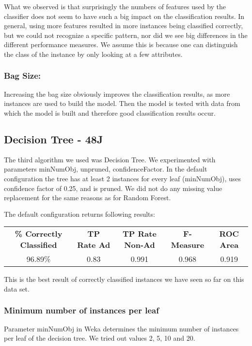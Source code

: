 \documentclass{article}
\begin{document}
What we observed is that surprisingly the numbers of features used by the classifier does not seem to have such a big impact on the classification results. In general, using more features resulted in more instances being classified correctly, but we could not recognize a specific pattern, nor did we see big differences in the different performance measures. We assume this is because one can distinguish the class of the instance by only looking at a few attributes.

\subsubsection{Bag Size:}
Increasing the bag size obviously improves the classification results, as more instances are used to build the model. Then the model is tested with data from which the model is built and therefore good classification results occur.

\subsection{Decision Tree - 48J}
The third algorithm we used was Decision Tree. We experimented with parameters minNumObj, unpruned, confidenceFactor. In the default configuration the tree has at least 2 instances for every leaf (minNumObj), uses confidence factor of 0.25, and is pruned. We did not do any missing value replacement for the same reasons as for Random Forest.

The default configuration returns following results:

\begin{center}
\begin{tabular}{c | c | c | c | c}
\textbf{\% Correctly Classified} & \textbf{TP Rate Ad} & \textbf{TP Rate Non-Ad} & \textbf{F-Measure} & \textbf{ROC Area}\\
96.89\% & 0.83 & 0.991  & 0.968 & 0.919\\
\end{tabular}
\end{center}

This is the best result of correctly classified instances we have seen so far on this data set.

\subsubsection{Minimum number of instances per leaf}
Parameter minNumObj in Weka determines the minimum number of instances per leaf of the decision tree. We tried out values 2, 5, 10 and 20.
\end{document}
